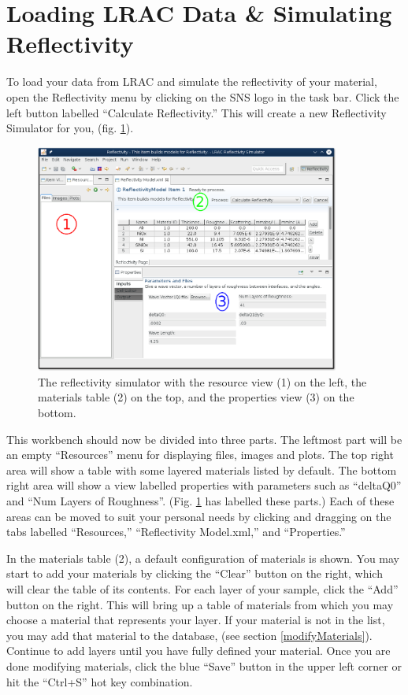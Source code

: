 \section{Loading LRAC Data \& Simulating Reflectivity}
\label{simulate}

To load your data from LRAC and simulate the reflectivity of your material, open
the Reflectivity menu by clicking on the SNS logo in the task bar. Click the
left button labelled ``Calculate Reflectivity.'' This will create a new
Reflectivity Simulator for you, (fig. \ref{simulator}).

\begin{figure}[!h]
\centering
\includegraphics[width=10cm]{images/simulator_sections.png}
\caption{The reflectivity simulator with the resource view (1) on the left, the
materials table (2) on the top, and the properties view (3) on the bottom.}
\label{simulator}
\end{figure}

This workbench should now be divided into three parts. The leftmost part will be
an empty ``Resources'' menu for displaying files, images and plots. The top
right area will show a table with some layered materials listed by default. The
bottom right area will show a view labelled properties with parameters such as
``deltaQ0'' and ``Num Layers of Roughness''. (Fig. \ref{simulator} has labelled
these parts.) Each of these areas can be moved to suit your personal needs by
clicking and dragging on the tabs labelled ``Resources,'' ``Reflectivity
Model.xml,'' and ``Properties.''

In the materials table (2), a default configuration of materials is shown. You
may start to add your materials by clicking the ``Clear'' button on the right,
which will clear the table of its contents. For each layer of your sample, click
the ``Add'' button on the right. This will bring up a table of materials from
which you may choose a material that represents your layer. If your material is
not in the list, you may add that material to the database, (see section
\ref{modifyMaterials}). Continue to add layers until you have fully defined your
material. Once you are done modifying materials, click the blue ``Save'' button
in the upper left corner or hit the ``Ctrl+S'' hot key combination.

